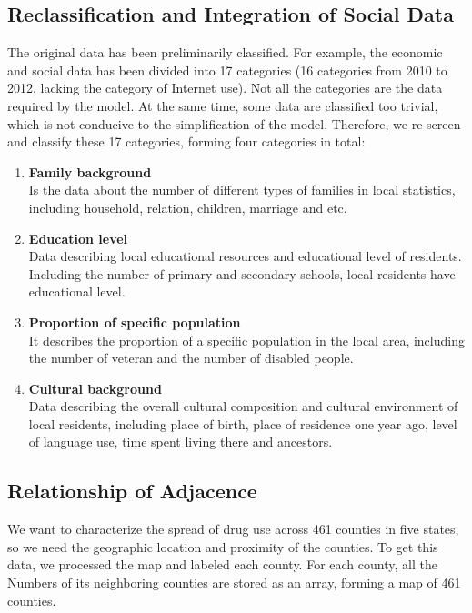 \documentclass{mcmthesis}
\begin{document}
\subsection{Reclassification and Integration of Social Data}
The original data has been preliminarily classified. For example, the economic and social data has been divided into 17 categories (16 categories from 2010 to 2012, lacking the category of Internet use). Not all the categories are the data required by the model. At the same time, some data are classified too trivial, which is not conducive to the simplification of the model. Therefore, we re-screen and classify these 17 categories, forming four categories in total:

\begin{enumerate}[label=\Alph*.]
\item \textbf{Family background}\\
 Is the data about the number of different types of families in local statistics, including household, relation, children, marriage and etc.
\item \textbf{Education level}\\
 Data describing local educational resources and educational level of residents. Including the number of primary and secondary schools, local residents have educational level.
\item \textbf{Proportion of specific population}\\
 It describes the proportion of a specific population in the local area, including the number of veteran and the number of disabled people.
\item \textbf{Cultural background}\\
 Data describing the overall cultural composition and cultural environment of local residents, including place of birth, place of residence one year ago, level of language use, time spent living there and ancestors.
\end{enumerate}

\subsection{Relationship of Adjacence} 
We want to characterize the spread of drug use across 461 counties in five states, so we need the geographic location and proximity of the counties. To get this data, we processed the map and labeled each county. For each county, all the Numbers of its neighboring counties are stored as an array, forming a map of 461 counties. \par
\end{document}
